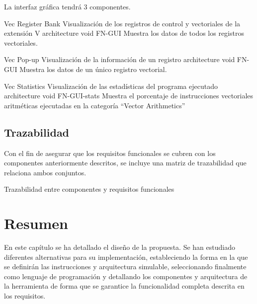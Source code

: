 La interfaz gráfica tendrá 3 componentes.

\begin{component}{Vec Register Bank} %
{Visualización de los registros de control y vectoriales de la extensión V}
{\NA}
{architecture}
{void}
{FN-GUI}
Muestra los datos de todos los registros vectoriales.
\end{component}

\begin{component}{Vec Pop-up} %
{Visualización de la información de un registro}
{\NA}
{architecture}
{void}
{FN-GUI}
Muestra los datos de un único registro vectorial.
\end{component}

\begin{component}{Vec Statistics} %
{Visualización de las estadísticas del programa ejecutado}
{\NA}
{architecture}
{void}
{FN-GUI-stats}
Muestra el porcentaje de instrucciones vectoriales aritméticas ejecutadas en la categoría ``Vector Arithmetics''
\end{component}

\FloatBarrier

\phantom{a}

\pagebreak

\subsection{Trazabilidad}

Con el fin de asegurar que los requisitos funcionales se cubren con los componentes anteriormente descritos, se incluye una matriz de trazabilidad que relaciona ambos conjuntos.

\begin{table}[H]
    {\traceabilityCompFN}
    \caption{Trazabilidad entre componentes y requisitos funcionales}\label{traz-3:compFN}
\end{table}

\section{Resumen}
En este capítulo se ha detallado el diseño de la propuesta. Se han estudiado diferentes alternativas para su implementación,  estableciendo la forma en la que se definirán las instrucciones y arquitectura simulable, seleccionando finalmente {\js} como lenguaje de programación y detallando los componentes y arquitectura de la herramienta de forma que se garantice la funcionalidad completa descrita en los requisitos. 
